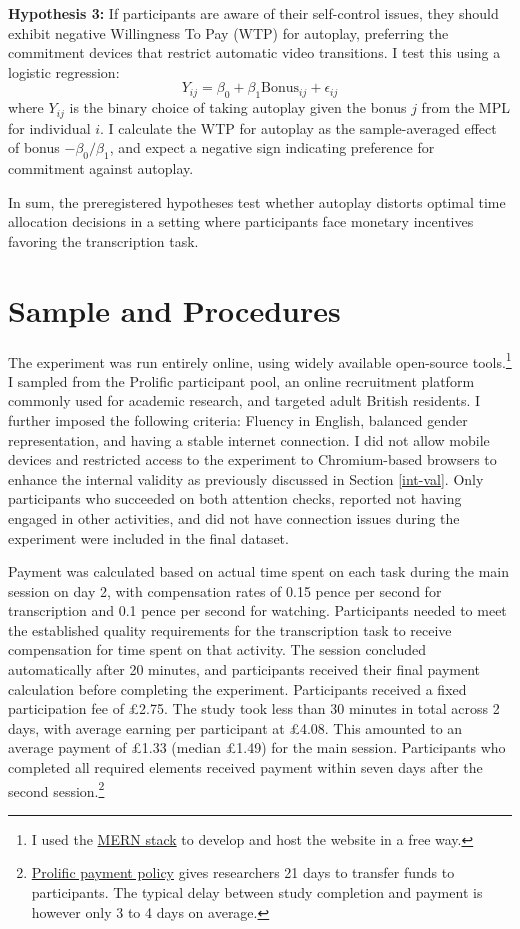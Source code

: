 \documentclass[11pt,a4paper,oneside]{article}
\begin{document}
\textbf{Hypothesis 3:} If participants are aware of their self-control issues, they should exhibit negative Willingness To Pay (WTP) for autoplay, preferring the commitment devices that restrict automatic video transitions. I test this using a logistic regression:
    \begin{equation}\label{eq2}
        {Y}_{ij} = \beta_{0} + \beta_{1} \text{Bonus}_{ij} + \epsilon_{ij}
    \end{equation}
where ${Y}_{ij}$ is the binary choice of taking autoplay given the bonus $j$ from the MPL for individual $i$. I calculate the WTP for autoplay as the sample-averaged effect of bonus $-\beta_{0}/\beta_{1}$, and expect a negative sign indicating preference for commitment against autoplay.

In sum, the preregistered hypotheses test whether autoplay distorts optimal time allocation decisions in a setting where participants face monetary incentives favoring the transcription task.

\section{Sample and Procedures}\label{SandP}
The experiment was run entirely online, using widely available open-source tools.\footnote{I used the \href{https://www.mongodb.com/languages/mern-stack-tutorial}{MERN stack} to develop and host the website in a free way.} I sampled from the Prolific participant pool, an online recruitment platform commonly used for academic research, and targeted adult British residents. I further imposed the following criteria: Fluency in English, balanced gender representation, and having a stable internet connection. I did not allow mobile devices and restricted access to the experiment to Chromium-based browsers to enhance the internal validity as previously discussed in Section \ref{int-val}. Only participants who succeeded on both attention checks, reported not having engaged in other activities, and did not have connection issues during the experiment were included in the final dataset.

Payment was calculated based on actual time spent on each task during the main session on day 2, with compensation rates of 0.15 pence per second for transcription and 0.1 pence per second for watching. Participants needed to meet the established quality requirements for the transcription task to receive compensation for time spent on that activity. The session concluded automatically after 20 minutes, and participants received their final payment calculation before completing the experiment. Participants received a fixed participation fee of £2.75. The study took less than 30 minutes in total across 2 days, with average earning per participant at £4.08. This amounted to an average payment of £1.33 (median £1.49) for the main session. Participants who completed all required elements received payment within seven days after the second session.\footnote{\href{https://participant-help.prolific.co/hc/en-gb/articles/360021786314-When-will-I-be-paid-for-a-study-}{Prolific payment policy} gives researchers 21 days to transfer funds to participants. The typical delay between study completion and payment is however only 3 to 4 days on average.} 
\end{document}
